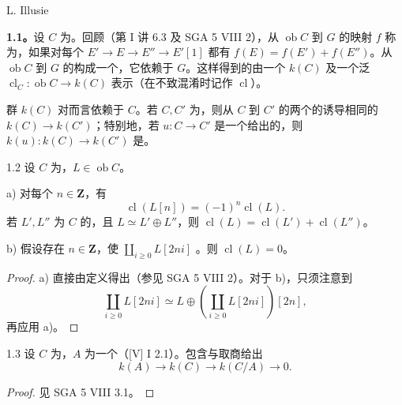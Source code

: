 \begin{center}L. Illusie\end{center}
\textbf{1.1。}设 $C$ 为。回顾（第 I 讲 6.3 及 SGA 5 VIII 2），从 $\operatorname{ob}C$ 到 $G$ 的映射 $f$ 称为，如果对每个 $E'\to E\to E''\to E'[1]$ 都有 $f(E)=f(E')+f(E'')$。从 $\operatorname{ob}C$ 到 $G$ 的构成一个，它依赖于 $G$。这样得到的由一个 $k(C)$ 及一个泛 $\operatorname{cl}_C:\operatorname{ob}C\to k(C)$ 表示（在不致混淆时记作 $\operatorname{cl}$）。

群 $k(C)$ 对而言依赖于 $C$。若 $C,C'$ 为，则从 $C$ 到 $C'$ 的两个的诱导相同的 $k(C)\to k(C')$；特别地，若 $u:C\to C'$ 是一个给出的，则 $k(u):k(C)\to k(C')$ 是。

\begin{SGAresult}{}{1.2}
设 $C$ 为，$L\in\operatorname{ob}C$。

 a) 对每个 $n\in\mathbf Z$，有
\[\operatorname{cl}(L[n])=(-1)^n\operatorname{cl}(L).\]
若 $L',L''$ 为 $C$ 的，且 $L\simeq L'\oplus L''$，则 $\operatorname{cl}(L)=\operatorname{cl}(L')+\operatorname{cl}(L'')$。

 b) 假设存在 $n\in\mathbf Z$，使 $\coprod_{i\geq0}L[2ni]$ 。则 $\operatorname{cl}(L)=0$。
\end{SGAresult}
\begin{proof}
a) 直接由定义得出（参见 SGA 5 VIII 2）。对于 b)，只须注意到
\[\coprod_{i\geq0}L[2ni]\simeq L\oplus\left(\coprod_{i\geq0}L[2ni]\right)[2n],\]
再应用 a)。
\end{proof}

\begin{SGAresult}{}{1.3}
设 $C$ 为，$A$ 为一个（[V] I 2.1）。包含与取商给出
\[k(A)\longrightarrow k(C)\longrightarrow k(C/A)\longrightarrow0.\]
\end{SGAresult}
\begin{proof}见 SGA 5 VIII 3.1。\end{proof}

